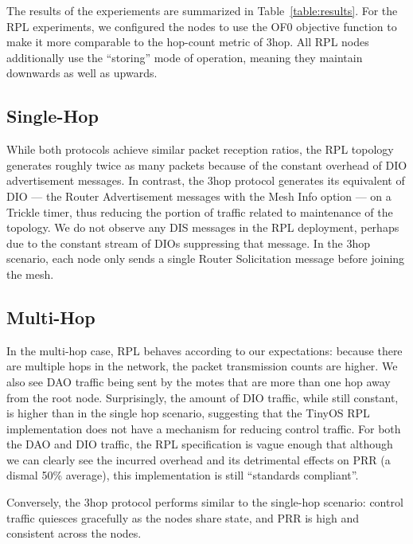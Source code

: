 The results of the experiements are summarized in Table~\ref{table:results}.
For the RPL experiments, we configured the nodes to use the OF0 objective function to make it more comparable to the hop-count metric of 3hop.
All RPL nodes additionally use the ``storing'' mode of operation, meaning they maintain downwards as well as upwards.

\subsection{Single-Hop}

While both protocols achieve similar packet reception ratios, the RPL topology generates roughly twice as many packets because of the constant overhead of DIO advertisement messages.
In contrast, the 3hop protocol generates its equivalent of DIO --- the Router Advertisement messages with the Mesh Info option --- on a Trickle timer, thus reducing the portion of traffic related to maintenance of the topology.
We do not observe any DIS messages in the RPL deployment, perhaps due to the constant stream of DIOs suppressing that message.
In the 3hop scenario, each node only sends a single Router Solicitation message before joining the mesh.

\subsection{Multi-Hop}

In the multi-hop case, RPL behaves according to our expectations: because there are multiple hops in the network, the packet transmission counts are higher.
We also see DAO traffic being sent by the motes that are more than one hop away from the root node.
Surprisingly, the amount of DIO traffic, while still constant, is higher than in the single hop scenario, suggesting that the TinyOS RPL implementation does not have a mechanism for reducing control traffic.
For both the DAO and DIO traffic, the RPL specification is vague enough that although we can clearly see the incurred overhead and its detrimental effects on PRR (a dismal 50\% average), this implementation is still ``standards compliant''.

Conversely, the 3hop protocol performs similar to the single-hop scenario: control traffic quiesces gracefully as the nodes share state, and PRR is high and consistent across the nodes.
